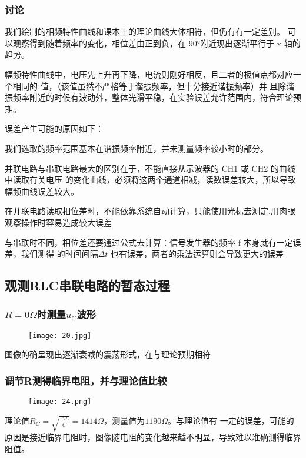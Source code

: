 \documentclass[11pt,a4paper]{article}
\begin{document}
    \subsubsection{讨论}
    我们绘制的相频特性曲线和课本上的理论曲线大体相符，但仍有有一定差别。
    可以观察得到随着频率的变化，相位差由正到负，在 90°附近现出逐渐平行于 x 轴的趋势。

    幅频特性曲线中，电压先上升再下降，电流则刚好相反，且二者的极值点都对应一个相同的
    值，（该值虽然不严格等于谐振频率，但十分接近谐振频率）并
    且除谐振频率附近的时候有波动外，整体光滑平稳，在实验误差允许范围内，符合理论预期。

    误差产生可能的原因如下：

    我们选取的频率范围基本在谐振频率附近，并未测量频率较小时的部分。

    并联电路与串联电路最大的区别在于，不能直接从示波器的 CH1 或 CH2 的曲线中读取有关电压
    的变化曲线，必须将这两个通道相减，读数误差较大，所以导致幅频曲线误差较大。

    在并联电路读取相位差时，不能依靠系统自动计算，只能使用光标去测定.用肉眼观察操作时容易造成较大误差
    
    与串联时不同，相位差还要通过公式去计算：信号发生器的频率 f 本身就有一定误差，我们测得
    的时间间隔$\Delta t$ 也有误差，两者的乘法运算则会导致更大的误差

    
    \subsection{观测RLC串联电路的暂态过程}
    \subsubsection{$R=0\Omega$时测量$u_C$波形}
    \begin{figure}[H]
        \centering
        \texttt{[image: 20.jpg]}
    \end{figure}
    图像的确呈现出逐渐衰减的震荡形式，在与理论预期相符

    \subsubsection{调节R测得临界电阻，并与理论值比较}

    \begin{figure}[H]
        \centering
        \texttt{[image: 24.png]}
    \end{figure}

    理论值$R_C=\sqrt{\frac{\Delta L}{C}}=1414\Omega$，测量值为$1190\Omega$。与理论值有
    一定的误差，可能的原因是接近临界电阻时，图像随电阻的变化越来越不明显，导致难以准确测得临界阻值。
\end{document}
